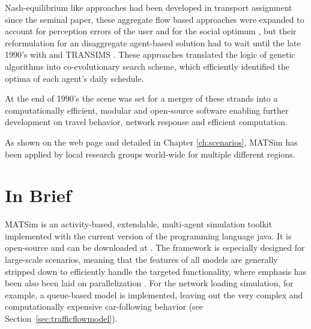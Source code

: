 
Nash-equilibrium like approaches had been developed in transport assignment since the seminal \citet[][]{Wardrop_PICE_1952} paper, these aggregate flow based approaches were expanded to account for perception errors of the user and for the social optimum \citep[see][]{DaganzoSheffi_TransScience_1977}, but their reformulation for an disaggregate agent-based solution had to wait until the late 1990’s with \citet[][]{Gawron_IJMPC_1998} and TRANSIMS \citep[][]{SmithEtAl_NTRPAC_1995}. These approaches translated the logic of genetic algorithms into co-evolutionary search scheme, which efficiently identified the optima of each agent’s daily schedule.

At the end of 1990’s the scene was set for a merger of these strands into a computationally efficient, modular and open-source software enabling further development on travel behavior, network response and efficient computation. 

As shown on the web page \citep[][]{MATSIM-T-Scenarios_Webpage_2015} and detailed in Chapter \ref{ch:scenarios}, MATSim has been applied by local research groups world-wide for multiple different regions. 

\section{In Brief}
MATSim is an activity-based, extendable, multi-agent simulation toolkit  implemented with the current version of the programming language \gls{java}. It is open-source and can be downloaded at \citep[][]{MATSIM-T_Webpage_2015, SourceForge_Webpage_2015}. The framework is especially designed for large-scale scenarios, meaning that the features of all models are generally stripped down to efficiently handle the targeted functionality, where emphasis has been also been laid on parallelization \citep[e.g.,][]{Dobler_TechRep_IVT_2011, Charypar_PhDThesis_2008}. For the network loading simulation, for example, a queue-based model is implemented, leaving out the very complex and computationally expensive car-following behavior (see Section~\ref{sec:trafficflowmodel}).

